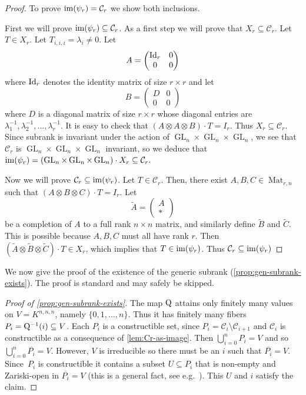 \documentclass[11pt]{article}
\theoremstyle{definition}
\theoremstyle{remark}
\newcommand{\subrank}{{\rm Q}}
\newcommand{\GL}{\operatorname{GL}}
\newcommand{\Mat}{\operatorname{Mat}}
\newcommand{\im}{{\rm im}}
\begin{document}
\begin{proof}
To prove $\im(\psi_r) = \mathcal{C}_r$ we show both inclusions.

First we will prove $\im(\psi_r) \subseteq \mathcal{C}_r$. As a first step we will prove that $X_r \subseteq \mathcal{C}_r$.
Let $T \in X_r$. Let $T_{i,i,i} = \lambda_i \neq 0$. Let 
\[
A = \begin{pmatrix} {\rm Id}_r & 0 \\ 0& 0 \end{pmatrix}
\]
where ${\rm Id}_r$ denotes the identity matrix of size $r \times r$ and let 
\[
B = \begin{pmatrix} D & 0 \\ 0 & 0\end{pmatrix}
\]
where $D$ is a diagonal matrix of size $r \times r$ whose diagonal entries are $\lambda_1^{-1},\lambda_2^{-1},\dots, \lambda_r^{-1}$. It is easy to check that $(A \otimes A \otimes B) \cdot T = I_r$. Thus $X_r \subseteq \mathcal{C}_r$. Since subrank is invariant under the action of $\GL_n \times \GL_n \times \GL_n$, we see that $\mathcal{C}_r$ is $\GL_n \times \GL_n \times \GL_n$ invariant, so we deduce that $\im(\psi_r) = (\GL_n \times \GL_n \times \GL_n) \cdot X_r \subseteq \mathcal{C}_r.$
 
Now we will prove $\mathcal{C}_r \subseteq \im(\psi_r)$. Let $T \in \mathcal{C}_r$. Then, there exist $A,B,C \in \Mat_{r,n}$ such that $(A \otimes B \otimes C) \cdot T = I_r$. Let \[
\widetilde{A} = \begin{pmatrix} A \\ \ast \end{pmatrix}
\]
be a completion of $A$ to a full rank $n \times n$ matrix, and similarly define $\widetilde{B}$ and $\widetilde{C}$. This is possible because $A,B,C$ must all have rank $r$. Then $(\widetilde{A} \otimes \widetilde{B} \otimes \widetilde{C})\cdot T \in X_r$, which implies that $T \in \im(\psi_r)$. Thus $\mathcal{C}_r \subseteq \im(\psi_r)$
\end{proof}

We now give the proof of the existence of the generic subrank (\autoref{prop:gen-subrank-exists}). The proof is standard and may safely be skipped.

\begin{proof}[{Proof of \autoref{prop:gen-subrank-exists}}]
The map $\subrank$ attains only finitely many values on $V = K^{n,n,n}$, namely $\{0,1,\ldots, n\}$. Thus it has finitely many fibers $P_i = \subrank^{-1}(i) \subseteq V$. Each $P_i$ is a constructible set, since $P_i = \mathcal{C}_i \setminus \mathcal{C}_{i+1}$ and $\mathcal{C}_i$ is constructible as a consequence of \autoref{lem:Cr-as-image}. Then $\bigcup_{i=0}^n P_i = V$ and so $\bigcup_{i=0}^n \overline{P_i} = V$. However, $V$ is irreducible so there must be an $i$ such that $\overline{P_i} = V$. Since~$P_i$ is constructible it contains a subset $U \subseteq P_i$ that is non-empty and Zariski-open in $\overline{P_i} = V$ (this is a general fact, see e.g.~\cite{MR1102012}). This $U$ and $i$ satisfy the claim.
\end{proof}
\end{document}
